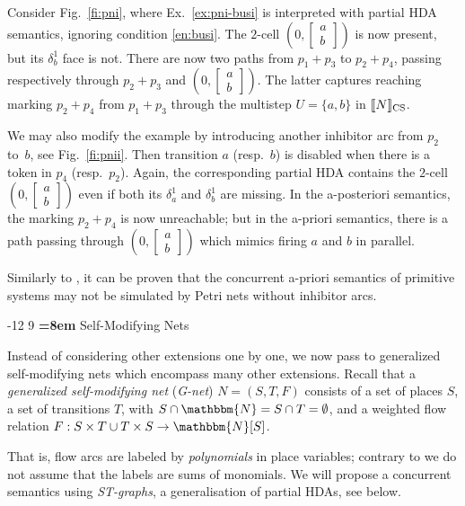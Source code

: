 \documentclass[runningheads,envcountsame]{llncs}
\makeatletter
\newcommand*\Nat{\mathbbm{N}}
\newcommand*\loset[1]{\left[\begin{smallmatrix}#1\end{smallmatrix}\right]}
\newcommand*\sem[1]{\llbracket #1\rrbracket}
\renewcommand\section{\@startsection{section}{1}{\z@}%
  {-12\p@ \@plus -3\p@ \@minus -3\p@}%
  {9\p@ \@plus 3\p@ \@minus 3\p@}%
  {\normalfont\large\bfseries\boldmath
    \rightskip=\z@ \@plus 8em\pretolerance=10000 }}
\makeatother
\begin{document}
\begin{example}
  \label{ex:pni}
  Consider Fig.~\ref{fi:pni}, where Ex.~\ref{ex:pni-busi} is interpreted with partial HDA semantics, ignoring condition \ref{en:busi}.
  The $2$-cell $(0, \loset{a\\b})$ is now present, but its $\delta_b^1$ face is not.
  There are now
  two paths from $p_1+p_3$ to $p_2+p_4$, passing respectively through $p_2+p_3$ and $(0,\loset{a\\b})$.
  The latter captures reaching marking $p_2+p_4$ from $p_1+p_3$ through the multistep $U = \{a,b\}$ in $\sem{N}_{\textup{CS}}$.

  We may also modify the example by introducing another inhibitor arc from $p_2$ to~$b$,
  see Fig.~\ref{fi:pnii}.
  Then transition $a$ (resp.\ $b$) is disabled when there is a token in $p_4$ (resp.\ $p_2$).
  Again, the corresponding partial HDA contains the $2$-cell $(0,\loset{a\\b})$ even if both its $\delta_a^1$ and $\delta_b^1$ are missing.
  In the a-posteriori semantics, the marking $p_2+p_4$ is now unreachable;
  but in the a-priori semantics,
  there is a path passing through $(0,\loset{a\\b})$ which mimics firing $a$ and $b$ in parallel.
\end{example}

Similarly to \cite[Thm.~5.20]{DBLP:journals/tcs/Busi02}, it can be proven that
the concurrent a-priori semantics of primitive systems may not be simulated by Petri nets without inhibitor arcs.

\section{Self-Modifying Nets}
\label{sec:SMN}

Instead of considering other extensions one by one, we now pass to generalized self-modifying nets
which encompass many other extensions.
%
Recall \cite{DBLP:conf/icalp/DufourdFS98}
that a \emph{generalized self-modifying net} (\emph{G-net}) $N=(S, T, F)$ consists of
a set of places $S$,
a set of transitions $T$, with $S\cap \Nat=S\cap T=\emptyset$,
and a weighted flow relation $F: S\times T\cup T\times S\to \Nat[S]$.

That is, flow arcs are labeled by \emph{polynomials} in place variables;
contrary to \cite{DBLP:conf/icalp/DufourdFS98} we do not assume that the labels are sums of monomials.
We will propose a concurrent semantics using \emph{ST-graphs}, a generalisation of partial HDAs, see below.
\end{document}
